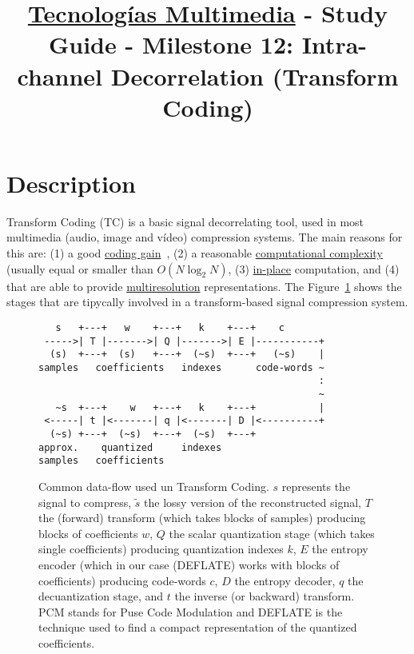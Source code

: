 \title{\href{https://www.ual.es/estudios/grados/presentacion/plandeestudios/asignatura/4015/40154321?idioma=zh_CN}{Tecnologías Multimedia} - Study Guide - Milestone 12: Intra-channel Decorrelation (Transform Coding)}

\maketitle

\section{Description}

Transform Coding (TC) is a basic signal decorrelating tool, used in
most multimedia (audio, image and vídeo) compression systems. The main
reasons for this are: (1) a good \href{}{coding
  gain}~\cite{sayood2017introduction}, (2) a reasonable
\href{}{computational complexity} (usually equal or smaller than
$O(N\log_2N)$, (3) \href{}{in-place} computation, and (4) that are
able to provide \href{}{multiresolution} representations. The
Figure~\ref{fig:transform_coding} shows the stages that are tipycally
involved in a transform-based signal compression system.

\begin{figure}
  \begin{center}
\begin{verbatim}
   s   +---+   w    +---+   k    +---+    c
 ----->| T |------->| Q |------->| E |-----------+
  (s)  +---+  (s)   +---+  (~s)  +---+   (~s)    |
samples   coefficients   indexes      code-words ~
                                                 :
                                                 ~
   ~s  +---+    w   +---+   k    +---+           |
 <-----| t |<-------| q |<-------| D |<----------+
  (~s) +---+  (~s)  +---+  (~s)  +---+
approx.    quantized     indexes
samples   coefficients
\end{verbatim}                
  \end{center}
  \caption{Common data-flow used un Transform Coding. $s$ represents
    the signal to compress, $\tilde{s}$ the lossy version of the
    reconstructed signal, $T$ the (forward) transform (which takes blocks of
    samples) producing blocks of coefficients $w$, $Q$ the scalar
    quantization stage (which takes single coefficients) producing
    quantization indexes $k$, $E$ the entropy encoder (which in our
    case (DEFLATE) works with blocks of coefficients) producing
    code-words $c$, $D$ the entropy decoder, $q$ the decuantization
    stage, and $t$ the inverse (or backward) transform. PCM stands for Puse Code
    Modulation and DEFLATE is the technique used to find a compact
    representation of the quantized coefficients.}
  \label{fig:transform_coding}
\end{figure}

